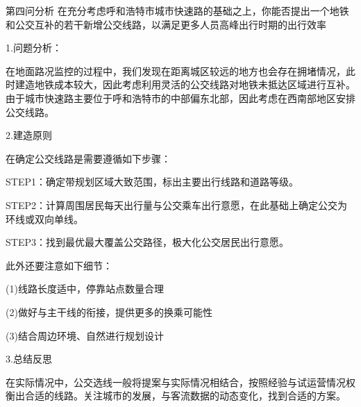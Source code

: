\documentclass[12pt,a4paper]{mcmthesis}
\begin{document}
第四问分析
在充分考虑呼和浩特市城市快速路的基础之上，你能否提出一个地铁和公交互补的若干新增公交线路，以满足更多人员高峰出行时期的出行效率

1.问题分析：

在地面路况监控的过程中，我们发现在距离城区较远的地方也会存在拥堵情况，此时建造地铁成本较大，因此考虑利用灵活的公交线路对地铁未抵达区域进行互补。由于城市快速路主要位于呼和浩特市的中部偏东北部，因此考虑在西南部地区安排公交线路。

2.建造原则

在确定公交线路是需要遵循如下步骤：

STEP1：确定带规划区域大致范围，标出主要出行线路和道路等级。

STEP2：计算周围居民每天出行量与公交乘车出行意愿，在此基础上确定公交为环线或双向单线。

STEP3：找到最优最大覆盖公交路径，极大化公交居民出行意愿。


此外还要注意如下细节：

(1)线路长度适中，停靠站点数量合理

(2)做好与主干线的衔接，提供更多的换乘可能性

(3)结合周边环境、自然进行规划设计

3.总结反思

在实际情况中，公交选线一般将提案与实际情况相结合，按照经验与试运营情况权衡出合适的线路。关注城市的发展，与客流数据的动态变化，找到合适的方案。
\end{document}
